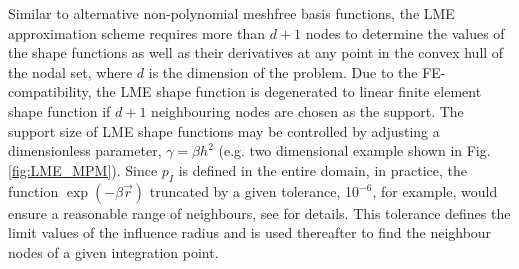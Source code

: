 Similar to alternative non-polynomial meshfree basis functions, the LME approximation scheme requires more than $d+1$ nodes to determine the values of the shape functions as well as their derivatives at any point in the convex hull of the nodal set, where $d$ is the dimension of the problem. Due to the FE-compatibility, the LME shape function is degenerated to linear finite element shape function if $d+1$ neighbouring nodes are chosen as the support. The support size of LME shape functions may be controlled by adjusting a dimensionless parameter, $\gamma=\beta h^2$ (e.g. two dimensional example shown in Fig. \ref{fig:LME_MPM})\cite{Arroyo2006}.
Since  $p_I$  is defined in  the entire domain, in practice,  the function $\exp(-\beta \vec{r} )$ truncated  by  a given tolerance, 10$^{-6}$, for example,  would ensure a reasonable range of neighbours, see \cite{Arroyo2006} for details. This  tolerance defines the limit values of the influence radius and   is used thereafter to find the neighbour nodes of a given integration point.


